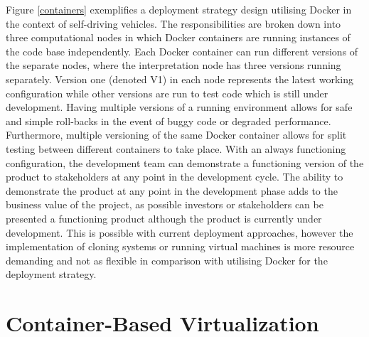 Figure \ref{containers} exemplifies a deployment strategy design utilising Docker in the context of self-driving vehicles. The responsibilities are broken down into three computational nodes in which Docker containers are running instances of the code base independently. Each Docker container can run different versions of the separate nodes, where the interpretation node has three versions running separately. Version one (denoted V1) in each node represents the latest working configuration while other versions are run to test code which is still under development. Having multiple versions of a running environment allows for safe and simple roll-backs in the event of buggy code or degraded performance. Furthermore, multiple versioning of the same Docker container allows for split testing between different containers to take place. With an always functioning configuration, the development team can demonstrate a functioning version of the product to stakeholders at any point in the development cycle. The ability to demonstrate the product at any point in the development phase adds to the business value of the project, as possible investors or stakeholders can be presented a functioning product although the product is currently under development. This is possible with current deployment approaches, however the implementation of cloning systems or running virtual machines is more resource demanding \cite{p6} and not as flexible in comparison with utilising Docker for the deployment strategy.


\section{Container-Based Virtualization}

